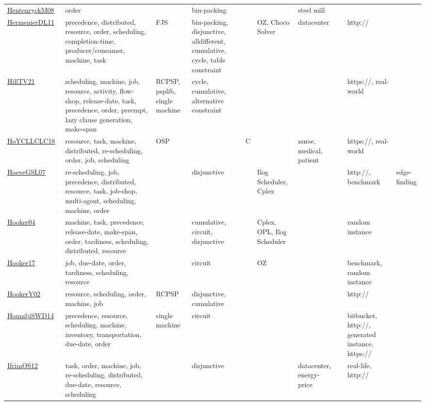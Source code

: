 {\begin{longtable}{p{3cm}p{4cm}p{2cm}p{2cm}p{2cm}p{2cm}p{2cm}p{2cm}p{2cm}p{2cm}}
\href{papers/HentenryckM08.pdf}{HentenryckM08}~\cite{HentenryckM08} & order &  & bin-packing &  &  & steel mill &  &  & \\
\href{papers/HermenierDL11.pdf}{HermenierDL11}~\cite{HermenierDL11} & precedence, distributed, resource, order, scheduling, completion-time, producer/consumer, machine, task & FJS & bin-packing, disjunctive, alldifferent, cumulative, cycle, table constraint &  & OZ, Choco Solver & datacenter &  & http:// & \\
\href{papers/HillTV21.pdf}{HillTV21}~\cite{HillTV21} & scheduling, machine, job, resource, activity, flow-shop, release-date, task, precedence, order, preempt, lazy clause generation, make-span & RCPSP, psplib, single machine & cycle, cumulative, alternative constraint &  &  &  &  & https://, real-world & \\
\href{papers/HoYCLLCLC18.pdf}{HoYCLLCLC18}~\cite{HoYCLLCLC18} & resource, task, machine, distributed, re-scheduling, order, job, scheduling & OSP &  & C  &  & nurse, medical, patient &  & https://, real-world & \\
\href{papers/HoeveGSL07.pdf}{HoeveGSL07}~\cite{HoeveGSL07} & re-scheduling, job, precedence, distributed, resource, task, job-shop, multi-agent, scheduling, machine, order &  & disjunctive &  & Ilog Scheduler, Cplex &  &  & http://, benchmark & edge-finding\\
\href{papers/Hooker04.pdf}{Hooker04}~\cite{Hooker04} & machine, task, precedence, release-date, make-span, order, tardiness, scheduling, distributed, resource &  & cumulative, circuit, disjunctive &  & Cplex, OPL, Ilog Scheduler &  &  & random instance & \\
\href{papers/Hooker17.pdf}{Hooker17}~\cite{Hooker17} & job, due-date, order, tardiness, scheduling, resource &  & circuit &  & OZ &  &  & benchmark, random instance & \\
\href{papers/HookerY02.pdf}{HookerY02}~\cite{HookerY02} & resource, scheduling, order, machine, job & RCPSP & disjunctive, cumulative &  &  &  &  & http:// & \\
\href{papers/HoundjiSWD14.pdf}{HoundjiSWD14}~\cite{HoundjiSWD14} & precedence, resource, scheduling, machine, inventory, transportation, due-date, order & single machine & circuit &  &  &  &  & bitbucket, http://, generated instance, https:// & \\
\href{papers/IfrimOS12.pdf}{IfrimOS12}~\cite{IfrimOS12} & task, order, machine, job, re-scheduling, distributed, due-date, resource, scheduling &  & disjunctive &  &  & datacenter, energy-price &  & real-life, http:// & \\

\end{longtable}}

